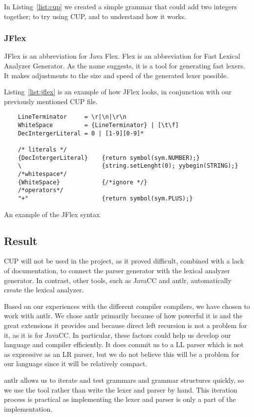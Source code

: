 In Listing~\ref{list:cup} we created a simple grammar that could add two integers together; to try using CUP, and to understand how it works.


\subsubsection{JFlex}
JFlex is an abbreviation for Java Flex. Flex is an abbreviation for Fast Lexical Analyzer Generator. As the name suggests, it is a tool for generating fast lexers. It makes adjustments to the size and speed of the generated lexer possible.

Listing~\ref{list:jflex} is an example of how JFlex looks, in conjunction with our previously mentioned CUP file.


\begin{listing}[htb!]
  \centering
  \begin{verbatim}
    LineTerminator     = \r|\n|\r\n
    WhiteSpace         = {LineTerminator} | [\t\f]
    DecIntergerLiteral = 0 | [1-9][0-9]*

    /* literals */
    {DecIntergerLiteral}    {return symbol(sym.NUMBER);}
    \                       {string.setLenght(0); yybegin(STRING);}
    /*whitespace*/ 
    {WhiteSpace}            {/*ignore */}  
    /*operators*/
    "+"                     {return symbol(sym.PLUS);}
  \end{verbatim}
  \caption{An example of the JFlex syntax}
  \label{list:jflex}
\end{listing}


\subsection{Result}
CUP will not be used in the project, as it proved difficult, combined with a lack of documentation, to connect the parser generator with the lexical analyzer generator. In contrast, other tools, such as JavaCC and \gls{antlr}, automatically create the lexical analyzer.

Based on our experiences with the different compiler compilers, we have chosen to work with \gls{antlr}. We chose \gls{antlr} primarily because of how powerful it is and the great extensions it provides and because direct left recursion is not a problem for it, as it is for JavaCC. In particular, these factors could help us develop our language and compiler efficiently. It does commit us to a LL parser which is not as expressive as an LR parser, but we do not believe this will be a problem for our language since it will be relatively compact.

\gls{antlr} allows us to iterate and test grammars and grammar structures quickly, so we use the tool rather than write the lexer and parser by hand. This iteration process is practical as implementing the lexer and parser is only a part of the implementation.